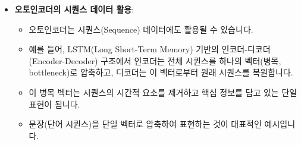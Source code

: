 \documentclass[11pt,a4paper]{article}
\theoremstyle{definition}
\begin{document}
\begin{itemize}
\begin{itemize}
        \item 스택 오토인코더는 여러 단계로 훈련될 수 있습니다.
        \item \textbf{단계 1}: 첫 번째 은닉층과 출력층만으로 구성된 얕은 오토인코더를 훈련합니다.
        \item \textbf{단계 2}: 첫 번째 층의 가중치(coefficients)를 고정(freeze)하고, 두 번째 은닉층을 추가하여 중간 부분을 훈련합니다.
        \item 이 과정을 반복하여 각 층을 순차적으로 훈련할 수 있습니다.
        \item 과거에는 각 층의 가중치 스케일이 달라 경사 하강법(gradient descent)의 수렴이 어려울 수 있었기 때문에 이러한 단계별 훈련 방식이 선호되었습니다.
        \item \textbf{가중치 스케일 문제}: 서로 다른 층의 가중치들이 매우 다른 스케일을 가질 경우, 경사 하강법이 최적점으로 수렴하지 못하고 발산하거나 매우 느리게 수렴할 수 있습니다. 이는 손실 함수의 등고선이 매우 길쭉한 형태를 띠게 되어, 경사 벡터가 최적점 방향이 아닌 다른 방향을 가리키기 때문입니다.
        \item \textbf{해결책}:
        \begin{itemize}
            \item \textbf{Adam 옵티마이저 (Adam Optimizer)}: 지역 곡률(local curvature)에 따라 학습률(learning rate)을 조절하여 경사 벡터의 방향을 효과적으로 조정합니다.
            \item \textbf{배치 정규화 (Batch Normalization)}: 각 층의 입력 신호를 정규화하여 가중치 스케일 문제를 완화합니다.
            \item \textbf{숏컷 연결 (Shortcut Connections)}: 일부 층을 건너뛰어 신호가 직접 전달되도록 하여, 신호 스케일 문제를 줄입니다.
        \end{itemize}
        \item 이러한 기술들 덕분에 오늘날에는 스택 오토인코더의 모든 층을 한 번에 훈련하는 것이 일반적입니다. 하지만 단계별 훈련 방식도 여전히 유효한 접근법입니다.
    \end{itemize}
    \item \textbf{오토인코더의 시퀀스 데이터 활용}:
    \begin{itemize}
        \item 오토인코더는 시퀀스(Sequence) 데이터에도 활용될 수 있습니다.
        \item 예를 들어, LSTM(Long Short-Term Memory) 기반의 인코더-디코더(Encoder-Decoder) 구조에서 인코더는 전체 시퀀스를 하나의 벡터(병목, bottleneck)로 압축하고, 디코더는 이 벡터로부터 원래 시퀀스를 복원합니다.
        \item 이 병목 벡터는 시퀀스의 시간적 요소를 제거하고 핵심 정보를 담고 있는 단일 표현이 됩니다.
        \item 문장(단어 시퀀스)을 단일 벡터로 압축하여 표현하는 것이 대표적인 예시입니다.
    \end{itemize}
\end{itemize}
\end{document}
